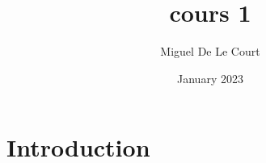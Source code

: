 \documentclass{article}
\title{cours 1}
\author{Miguel De Le Court}
\date{January 2023}
\begin{document}
\maketitle

\section{Introduction}
\end{document}
